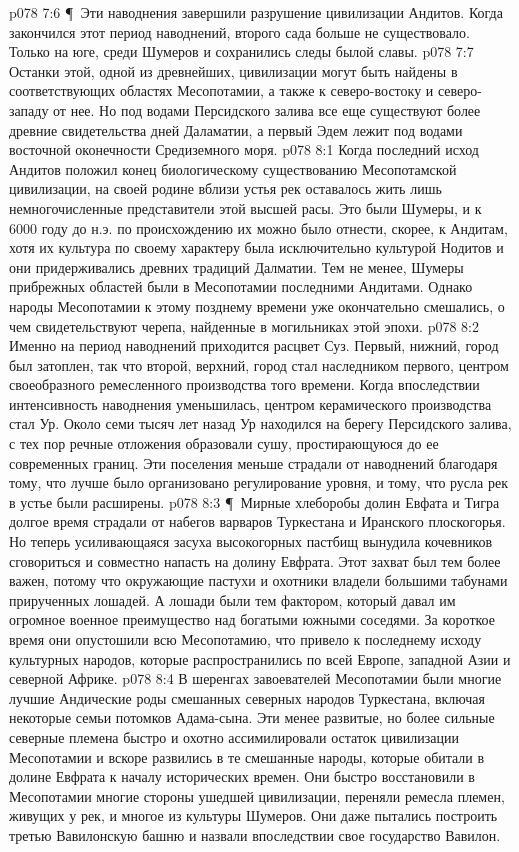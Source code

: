 \vs p078 7:6 \P\ Эти наводнения завершили разрушение цивилизации Андитов. Когда закончился этот период наводнений, второго сада больше не существовало. Только на юге, среди Шумеров и сохранились следы былой славы.
\vs p078 7:7 Останки этой, одной из древнейших, цивилизации могут быть найдены в соответствующих областях Месопотамии, а также к северо\hyp{}востоку и северо\hyp{}западу от нее. Но под водами Персидского залива все еще существуют более древние свидетельства дней Даламатии, а первый Эдем лежит под водами восточной оконечности Средиземного моря.
\vs p078 8:1 Когда последний исход Андитов положил конец биологическому существованию Месопотамской цивилизации, на своей родине вблизи устья рек оставалось жить лишь немногочисленные представители этой высшей расы. Это были Шумеры, и к 6000 году до н.э. по происхождению их можно было отнести, скорее, к Андитам, хотя их культура по своему характеру была исключительно культурой Нодитов и они придерживались древних традиций Далматии. Тем не менее, Шумеры прибрежных областей были в Месопотамии последними Андитами. Однако народы Месопотамии к этому позднему времени уже окончательно смешались, о чем свидетельствуют черепа, найденные в могильниках этой эпохи.
\vs p078 8:2 Именно на период наводнений приходится расцвет Суз. Первый, нижний, город был затоплен, так что второй, верхний, город стал наследником первого, центром своеобразного ремесленного производства того времени. Когда впоследствии интенсивность наводнения уменьшилась, центром керамического производства стал Ур. Около семи тысяч лет назад Ур находился на берегу Персидского залива, с тех пор речные отложения образовали сушу, простирающуюся до ее современных границ. Эти поселения меньше страдали от наводнений благодаря тому, что лучше было организовано регулирование уровня, и тому, что русла рек в устье были расширены.
\vs p078 8:3 \P\ Мирные хлеборобы долин Евфата и Тигра долгое время страдали от набегов варваров Туркестана и Иранского плоскогорья. Но теперь усиливающаяся засуха высокогорных пастбищ вынудила кочевников сговориться и совместно напасть на долину Евфрата. Этот захват был тем более важен, потому что окружающие пастухи и охотники владели большими табунами прирученных лошадей. А лошади были тем фактором, который давал им огромное военное преимущество над богатыми южными соседями. За короткое время они опустошили всю Месопотамию, что привело к последнему исходу культурных народов, которые распространились по всей Европе, западной Азии и северной Африке.
\vs p078 8:4 В шеренгах завоевателей Месопотамии были многие лучшие Андические роды смешанных северных народов Туркестана, включая некоторые семьи потомков Адама\hyp{}сына. Эти менее развитые, но более сильные северные племена быстро и охотно ассимилировали остаток цивилизации Месопотамии и вскоре развились в те смешанные народы, которые обитали в долине Евфрата к началу исторических времен. Они быстро восстановили в Месопотамии многие стороны ушедшей цивилизации, переняли ремесла племен, живущих у рек, и многое из культуры Шумеров. Они даже пытались построить третью Вавилонскую башню и назвали впоследствии свое государство Вавилон.
